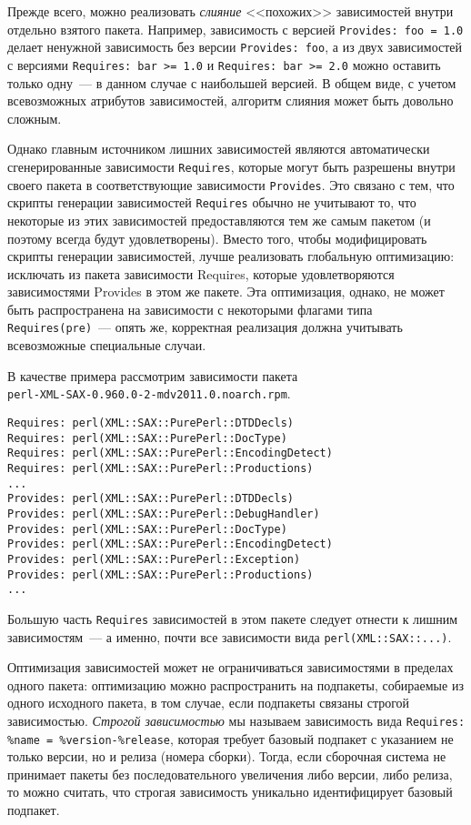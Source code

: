 \documentclass[russian,a4paper,12pt,titlepage]{article}
\begin{document}
Прежде всего, можно реализовать \textit{слияние} <<похожих>> зависимостей внутри отдельно взятого пакета.
Например, зависимость с версией \verb|Provides: foo = 1.0| делает ненужной зависимость без версии \verb|Provides: foo|,
а из двух зависимостей с версиями \verb|Requires: bar >= 1.0| и \verb|Requires: bar >= 2.0| можно оставить только
одну~--- в данном случае с наибольшей версией.  В общем виде, с учетом всевозможных атрибутов зависимостей,
алгоритм слияния может быть довольно сложным.

Однако главным источником лишних зависимостей являются автоматически сгенерированные зависимости \verb|Requires|,
которые могут быть разрешены внутри своего пакета в соответствующие зависимости \verb|Provides|.  Это
связано с тем, что скрипты генерации зависимостей \verb|Requires| обычно не учитывают то, что некоторые
из этих зависимостей предоставляются тем же самым пакетом (и поэтому всегда будут удовлетворены).
Вместо того, чтобы модифицировать скрипты генерации зависимостей, лучше реализовать глобальную оптимизацию:
исключать из пакета зависимости Requires, которые удовлетворяются зависимостями Provides в этом же пакете.
Эта оптимизация, однако, не может быть распространена на зависимости с некоторыми флагами типа \verb|Requires(pre)|~---
опять же, корректная реализация должна учитывать всевозможные специальные случаи.

В качестве примера рассмотрим зависимости пакета\\ \verb|perl-XML-SAX-0.960.0-2-mdv2011.0.noarch.rpm|.
\begin{verbatim}
Requires: perl(XML::SAX::PurePerl::DTDDecls)
Requires: perl(XML::SAX::PurePerl::DocType)
Requires: perl(XML::SAX::PurePerl::EncodingDetect)
Requires: perl(XML::SAX::PurePerl::Productions)
...
Provides: perl(XML::SAX::PurePerl::DTDDecls)
Provides: perl(XML::SAX::PurePerl::DebugHandler)
Provides: perl(XML::SAX::PurePerl::DocType)
Provides: perl(XML::SAX::PurePerl::EncodingDetect)
Provides: perl(XML::SAX::PurePerl::Exception)
Provides: perl(XML::SAX::PurePerl::Productions)
...
\end{verbatim}
Большую часть \verb|Requires| зависимостей в этом пакете следует отнести к лишним зависимостям~---
а именно, почти все зависимости вида \verb|perl(XML::SAX::...)|.

Оптимизация зависимостей может не ограничиваться зависимостями в пределах одного пакета:
оптимизацию можно распространить на подпакеты, собираемые из одного исходного пакета, в том случае,
если подпакеты связаны строгой зависимостью.  \textit{Строгой зависимостью} мы называем зависимость
вида \verb|Requires: %name = %version-%release|, которая требует базовый подпакет с указанием не
только версии, но и релиза (номера сборки).  Тогда, если сборочная система не принимает пакеты
без последовательного увеличения либо версии, либо релиза, то можно считать, что строгая зависимость
уникально идентифицирует базовый подпакет.
\end{document}
